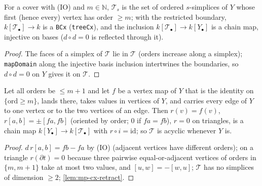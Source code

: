 \begin{definition}\label{def:mp-tree-cx}
  \leanok
  For a cover with (IO) and $m\in\mathbb N$, $\mathcal T_s$ is the set of ordered $s$-simplices of $Y$ whose first (hence every)
  vertex has order $\ge m$; with the restricted boundary, $k[\mathcal T_\bullet]\to k$ is a \texttt{BCx} (\texttt{treeCx}), and the
  inclusion $k[\mathcal T_\bullet]\to k[Y_\bullet]$ is a chain map, injective on bases ($d\circ d=0$ is reflected through it).
\end{definition}
\begin{proof}
  \leanok
  The faces of a simplex of $\mathcal T$ lie in $\mathcal T$ (orders increase along a simplex); \texttt{mapDomain} along the injective
  basis inclusion intertwines the boundaries, so $d\circ d=0$ on $Y$ gives it on $\mathcal T$.
\end{proof}

\begin{theorem}\label{thm:mp-tree-acyclic}
  \leanok
  Let all orders be $\le m+1$ and let $f$ be a vertex map of $Y$ that is the identity on $\{\mathrm{ord}\ge m\}$, lands there, takes
  values in vertices of $Y$, and carries every edge of $Y$ to one vertex or to the two vertices of an edge.  Then
  $r(v)=f(v)$, $r[a,b]=\pm[f a,f b]$ (oriented by order; $0$ if $fa=fb$), $r=0$ on triangles, is a chain map
  $k[Y_\bullet]\to k[\mathcal T_\bullet]$ with $r\circ i=\mathrm{id}$; so $\mathcal T$ is acyclic whenever $Y$ is.
\end{theorem}
\begin{proof}
  \leanok
  $d\,r[a,b]=fb-fa$ by (IO) (adjacent vertices have different orders); on a triangle $r(\partial t)=0$ because three pairwise
  equal-or-adjacent vertices of orders in $\{m,m+1\}$ take at most two values, and $[u,w]=-[w,u]$; $\mathcal T$ has no simplices of
  dimension $\ge2$; \ref{lem:mp-cx-retract}.
\end{proof}

